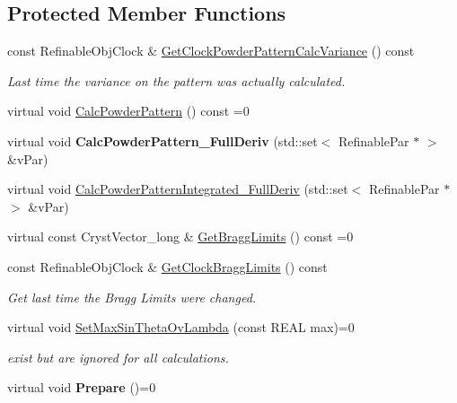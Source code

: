 \subsection*{Protected Member Functions}
\begin{DoxyCompactItemize}
\item 
\mbox{\label{class_obj_cryst_1_1_powder_pattern_component_ab38cfcfb77ef9a451973341ff26ecaa4}} 
const Refinable\+Obj\+Clock \& \mbox{\hyperlink{class_obj_cryst_1_1_powder_pattern_component_ab38cfcfb77ef9a451973341ff26ecaa4}{Get\+Clock\+Powder\+Pattern\+Calc\+Variance}} () const
\begin{DoxyCompactList}\small\item\em Last time the variance on the pattern was actually calculated. \end{DoxyCompactList}\item 
virtual void \mbox{\hyperlink{class_obj_cryst_1_1_powder_pattern_component_a8417ecb93009a9b7b9fccf074a9438d9}{Calc\+Powder\+Pattern}} () const =0
\item 
\mbox{\label{class_obj_cryst_1_1_powder_pattern_component_a1b96bb72b7d85443956ffd4317833860}} 
virtual void {\bfseries Calc\+Powder\+Pattern\+\_\+\+Full\+Deriv} (std\+::set$<$ Refinable\+Par $\ast$ $>$ \&v\+Par)
\item 
virtual void \mbox{\hyperlink{class_obj_cryst_1_1_powder_pattern_component_a7825422fec4a6ee5f1a00bc4063104ef}{Calc\+Powder\+Pattern\+Integrated\+\_\+\+Full\+Deriv}} (std\+::set$<$ Refinable\+Par $\ast$ $>$ \&v\+Par)
\item 
virtual const Cryst\+Vector\+\_\+long \& \mbox{\hyperlink{class_obj_cryst_1_1_powder_pattern_component_a727488f859528b0a9b5da47973804e01}{Get\+Bragg\+Limits}} () const =0
\item 
\mbox{\label{class_obj_cryst_1_1_powder_pattern_component_af922fda14bfdd904fb2b3a9fc8d794d1}} 
const Refinable\+Obj\+Clock \& \mbox{\hyperlink{class_obj_cryst_1_1_powder_pattern_component_af922fda14bfdd904fb2b3a9fc8d794d1}{Get\+Clock\+Bragg\+Limits}} () const
\begin{DoxyCompactList}\small\item\em Get last time the Bragg Limits were changed. \end{DoxyCompactList}\item 
virtual void \mbox{\hyperlink{class_obj_cryst_1_1_powder_pattern_component_a4731b5a64ee9aab6779e2ef323242fe5}{Set\+Max\+Sin\+Theta\+Ov\+Lambda}} (const R\+E\+AL max)=0
\begin{DoxyCompactList}\small\item\em exist but are ignored for all calculations. \end{DoxyCompactList}\item 
\mbox{\label{class_obj_cryst_1_1_powder_pattern_component_a6a99877f0f9dec09fd5f596a7ddeb6f6}} 
virtual void {\bfseries Prepare} ()=0
\end{DoxyCompactItemize}
